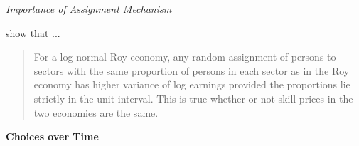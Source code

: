 \begin{frame}\begin{center}
		\LARGE\textit{Importance of Assignment Mechanism}
\end{center}\end{frame}
\begin{frame}
	 show that ... \vspace{0.5cm} \\
	\begin{quote} For a log normal Roy economy, any random assignment of persons to sectors with the same proportion of persons in each sector as in the Roy economy has higher variance of log earnings provided the proportions lie strictly in the unit interval. This is true whether or not skill prices in the two economies are the same.
	\end{quote}
\end{frame}
\begin{frame}
	\begin{center} \textbf{Choices over Time}\\\vspace{0.5cm}
	\end{center}
\end{frame}
